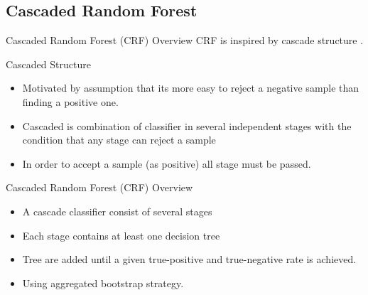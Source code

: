 \documentclass{beamer}
\begin{document}
\subsection{Cascaded Random Forest}

\begin{frame}{Cascaded Random Forest (CRF)}
	{Overview}
	CRF is inspired by cascade structure \cite{viola2004robust}.

	\begin{block}{Cascaded Structure}
		\begin{itemize}
		\item Motivated by assumption that its more easy to reject a negative
		sample than finding a positive one.
		\item Cascaded is combination of classifier in several independent
		stages with the condition that any stage can reject a sample
		\item In order to accept a sample (as positive) all stage must be
		passed.
		\end{itemize}
	\end{block}
\end{frame}

\begin{frame}
	{Cascaded Random Forest (CRF)}
	{Overview}
	\begin{itemize}
		\item A cascade classifier consist of several stages
		\item Each stage contains at least one decision tree
		\item Tree are added until a given true-positive and true-negative rate
		is achieved.
		\item Using aggregated bootstrap strategy.
	\end{itemize}
\end{frame}
\end{document}
